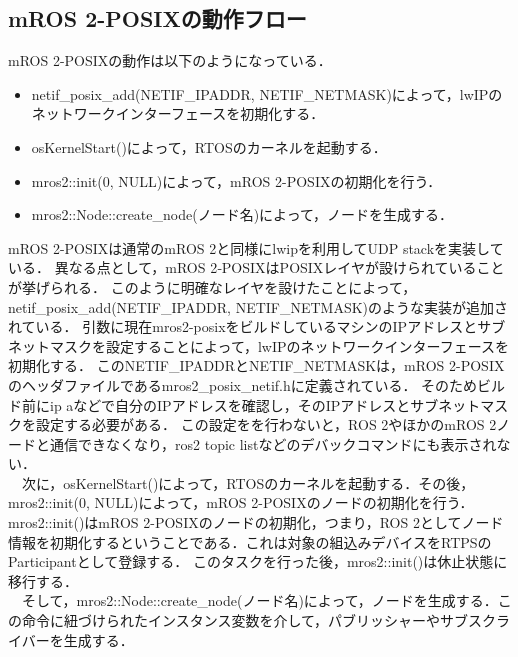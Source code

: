 \subsection{mROS 2-POSIXの動作フロー}
mROS 2-POSIXの動作は以下のようになっている．
\begin{itemize}
    \item netif\_posix\_add(NETIF\_IPADDR, NETIF\_NETMASK)によって，lwIPのネットワークインターフェースを初期化する．
    \item osKernelStart()によって，RTOSのカーネルを起動する．
    \item mros2::init(0, NULL)によって，mROS 2-POSIXの初期化を行う．
    \item mros2::Node::create\_node(ノード名)によって，ノードを生成する．
\end{itemize}
mROS 2-POSIXは通常のmROS 2と同様にlwipを利用してUDP stackを実装している．
異なる点として，mROS 2‐POSIXはPOSIXレイヤが設けられていることが挙げられる．
このように明確なレイヤを設けたことによって，netif\_posix\_add(NETIF\_IPADDR, NETIF\_NETMASK)のような実装が追加されている．
引数に現在mros2-posixをビルドしているマシンのIPアドレスとサブネットマスクを設定することによって，lwIPのネットワークインターフェースを初期化する．
このNETIF\_IPADDRとNETIF\_NETMASKは，mROS 2-POSIXのヘッダファイルであるmros2\_posix\_netif.hに定義されている．
そのためビルド前にip aなどで自分のIPアドレスを確認し，そのIPアドレスとサブネットマスクを設定する必要がある．
この設定をを行わないと，ROS 2やほかのmROS 2ノードと通信できなくなり，ros2 topic listなどのデバックコマンドにも表示されない．
\\　次に，osKernelStart()によって，RTOSのカーネルを起動する．その後，mros2::init(0, NULL)によって，mROS 2-POSIXのノードの初期化を行う．
mros2::init()はmROS 2-POSIXのノードの初期化，つまり，ROS 2としてノード情報を初期化するということである．これは対象の組込みデバイスをRTPSのParticipantとして登録する．
このタスクを行った後，mros2::init()は休止状態に移行する．
\\　そして，mros2::Node::create\_node(ノード名)によって，ノードを生成する．この命令に紐づけられたインスタンス変数を介して，パブリッシャーやサブスクライバーを生成する．

